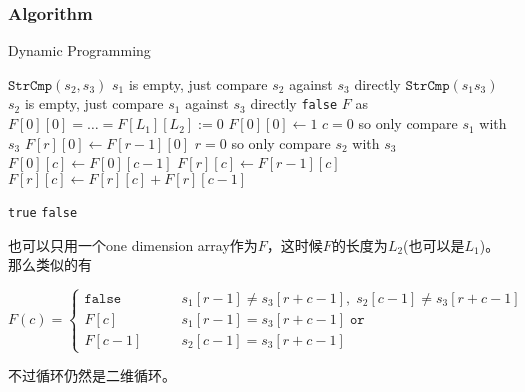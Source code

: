 \subsubsection{Algorithm}
\setcounter{algorithm}{0}
\begin{algorithm}[H]
\caption{Dynamic Programming}
\begin{algorithmic}[1]
\State \Return $\texttt{StrCmp}(s_2, s_3)$ \Comment $s_1$ is empty, just compare $s_2$ against $s_3$ directly
\EndIf
{}
\State \Return $\texttt{StrCmp}(s_1 s_3)$ \Comment $s_2$ is empty, just compare $s_1$ against $s_3$ directly
\EndIf
{}
\State \Return \texttt{false}
\EndIf
\State $F$ as $F[0][0]=\ldots=F[L_1][L_2]:=0$
\State $F[0][0]\gets 1$
 \Comment $c=0$ so only compare $s_1$ with $s_3$
\State $F[r][0] \gets F[r-1][0]$
\EndIf
\EndFor
{}
 \Comment $r=0$ so only compare $s_2$ with $s_3$
\State $F[0][c] \gets F[0][c-1]$
\EndIf
\EndFor
{}
\State $F[r][c] \gets F[r-1][c]$
\EndIf
{}
\State $F[r][c] \gets F[r][c] + F[r][c-1]$
\EndIf
{}
\end{algorithmic}
\end{algorithm}
\begin{algorithm}[H]
\begin{algorithmic}[1]
\EndFor
\EndFor
{}
\State \Return \texttt{true}
\Else
\State \Return \texttt{false}
\EndIf
\EndProcedure
\end{algorithmic}
\end{algorithm}
\begin{CJK*}{UTF8}{gbsn}
也可以只用一个one dimension array作为$F$，这时候$F$的长度为$L_2$(也可以是$L_1$)。那么类似的有
\end{CJK*}
\[
F(c) = 
\begin{cases}
\texttt{false} &\qquad s_1[r-1]\neq s_3[r+c-1], \;s_2[c-1]\neq s_3[r+c-1]\\
F[c] &\qquad s_1[r-1]= s_3[r+c-1] \; \texttt{or} \\
F[c-1] &\qquad s_2[c-1]= s_3[r+c-1] 
\end{cases}
\]
\begin{CJK*}{UTF8}{gbsn}
不过循环仍然是二维循环。
\end{CJK*}